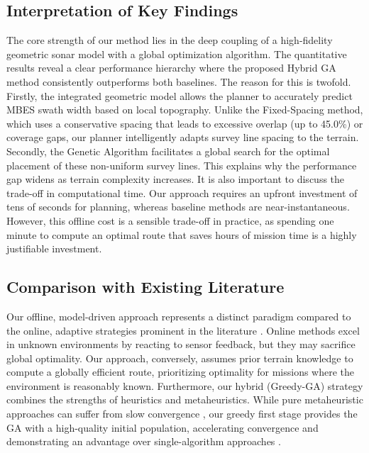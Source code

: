 \documentclass[compress]{cm}
\begin{document}
\subsection{Interpretation of Key Findings}
The core strength of our method lies in the deep coupling of a high-fidelity geometric sonar model with a global optimization algorithm. The quantitative results reveal a clear performance hierarchy where the proposed Hybrid GA method consistently outperforms both baselines. The reason for this is twofold. Firstly, the integrated geometric model allows the planner to accurately predict MBES swath width based on local topography. Unlike the Fixed-Spacing method, which uses a conservative spacing that leads to excessive overlap (up to 45.0\%) or coverage gaps, our planner intelligently adapts survey line spacing to the terrain. Secondly, the Genetic Algorithm facilitates a global search for the optimal placement of these non-uniform survey lines. This explains why the performance gap widens as terrain complexity increases. It is also important to discuss the trade-off in computational time. Our approach requires an upfront investment of tens of seconds for planning, whereas baseline methods are near-instantaneous. However, this offline cost is a sensible trade-off in practice, as spending one minute to compute an optimal route that saves hours of mission time is a highly justifiable investment.

\subsection{Comparison with Existing Literature}
Our offline, model-driven approach represents a distinct paradigm compared to the online, adaptive strategies prominent in the literature \cite{xie2024three, li2024full, ji2022multi, wu2024complete}. Online methods excel in unknown environments by reacting to sensor feedback, but they may sacrifice global optimality. Our approach, conversely, assumes prior terrain knowledge to compute a globally efficient route, prioritizing optimality for missions where the environment is reasonably known. Furthermore, our hybrid (Greedy-GA) strategy combines the strengths of heuristics and metaheuristics. While pure metaheuristic approaches can suffer from slow convergence \cite{kapetanovic2018side, tang2023coverage, cao2018real}, our greedy first stage provides the GA with a high-quality initial population, accelerating convergence and demonstrating an advantage over single-algorithm approaches \cite{zhang2023multi, han2023hybrid}.
\end{document}
